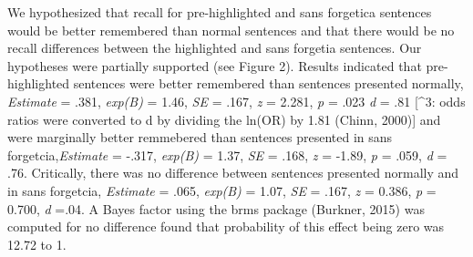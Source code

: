 \documentclass[pdf]{apa6}
\newenvironment{Shaded}{\begin{snugshade}}{\end{snugshade}}
\newcommand{\CommentTok}[1]{\textcolor[rgb]{0.56,0.35,0.01}{\textit{#1}}}
\newcommand{\DataTypeTok}[1]{\textcolor[rgb]{0.13,0.29,0.53}{#1}}
\newcommand{\DecValTok}[1]{\textcolor[rgb]{0.00,0.00,0.81}{#1}}
\newcommand{\KeywordTok}[1]{\textcolor[rgb]{0.13,0.29,0.53}{\textbf{#1}}}
\newcommand{\NormalTok}[1]{#1}
\newcommand{\OperatorTok}[1]{\textcolor[rgb]{0.81,0.36,0.00}{\textbf{#1}}}
\newcommand{\StringTok}[1]{\textcolor[rgb]{0.31,0.60,0.02}{#1}}
\begin{document}
We hypothesized that recall for pre-highlighted and sans forgetica sentences would be better remembered than normal sentences and that there would be no recall differences between the highlighted and sans forgetia sentences. Our hypotheses were partially supported (see Figure 2). Results indicated that pre-highlighted sentences were better remembered than sentences presented normally, \emph{Estimate} = .381, \emph{exp(B)} = 1.46, \emph{SE} = .167, \emph{z} = 2.281, \emph{p} = .023 \emph{d} = .81 {[}\^{}3: odds ratios were converted to d by dividing the ln(OR) by 1.81 (Chinn, 2000){]} and were marginally better remmebered than sentences presented in sans forgetcia,\emph{Estimate} = -.317, \emph{exp(B)} = 1.37, \emph{SE} = .168, \emph{z} = -1.89, \emph{p} = .059, \emph{d} = .76. Critically, there was no difference between sentences presented normally and in sans forgetcia, \emph{Estimate} = .065, \emph{exp(B)} = 1.07, \emph{SE} = .167, \emph{z} = 0.386, \emph{p} = 0.700, \emph{d} =.04. A Bayes factor using the brms package (Burkner, 2015) was computed for no difference found that probability of this effect being zero was 12.72 to 1.

\begin{Shaded}
\end{Shaded}
\end{document}
